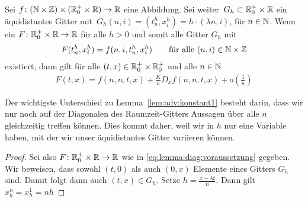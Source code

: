 \begin{lemma}
Sei $f\colon (\mathbb N \times \mathbb Z) \times (\mathbb R^+_0 \times \mathbb R) \to \mathbb R$ eine Abbildung.
Sei weiter\, $G_h \subset \mathbb R^+_0 \times \mathbb R$ ein äquidistantes Gitter mit\, $G_h(n,i) = (t^h_n, x^h_i) = h \cdot (\lambda n, i)$, für $n \in \mathbb N$.
Wenn ein $F\colon \mathbb R^+_0 \times \mathbb R \to \mathbb R$ für alle $h > 0$ und somit alle Gitter $G_h$ mit
\begin{align}\label{eq:lemma:diag:voraussetzung}
F(t^h_n, x^h_i) = f(n, i, t^h_n, x^h_i) \qquad \text{für alle $(n,i) \in \mathbb N \times \mathbb Z$}
\end{align}
existiert, dann gilt für alle $(t, x) \in \mathbb R^+_0 \times \mathbb R^+_0$ und alle $n \in \mathbb N$
\begin{align}\label{eq:lemma:diag:aussage}
F(t, x) = f(n, n, t, x) + \frac K n D_x f(n, n, t, x) + o(\frac 1 n)
\end{align}
\end{lemma}
Der wichtigste Unterschied zu Lemma~\ref{lem:adv:konstant1} besteht darin, dass wir nur noch auf der Diagonalen des Raumzeit-Gitters Aussagen über alle $n$ gleichzeitig treffen können.
Dies kommt daher, weil wir in $h$ nur eine Variable haben, mit der wir unser äquidistantes Gitter variieren können.
\begin{proof}
Sei also $F\colon \mathbb R^+_0 \times \mathbb R \to \mathbb R$ wie in \eqref{eq:lemma:diag:voraussetzung} gegeben.
Wir beweisen, dass sowohl $(t,0)$ als auch $(0,x)$ Elemente eines Gitters $G_h$ sind.
Damit folgt dann auch $(t,x) \in G_h$.
Setze $h = \frac {x - \lambda t}{n}$. Dann gilt $x^n_h = x^1_h = n h$
\end{proof}